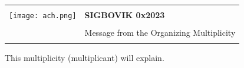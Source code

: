 \documentclass[12pt]{article}
\begin{document}
{\sffamily
\begin{tabular}{ll}
\multirow{3}{*}{\texttt{[image: ach.png]}}\\
& \textbf{\Huge{SIGBOVIK 0x2023}} \\ &\\
& \LARGE{Message from the Organizing Multiplicity} \\
&\\
\hline
\end{tabular}}
\vfill
\thispagestyle{empty}

%





This multiplicity (multiplicant) will explain.
\end{document}
